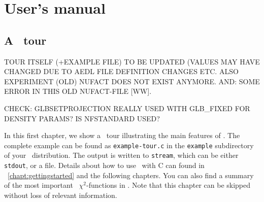 
\part{User's manual}
\label{part:1}

\chapter{A \GLOBES\ tour}
\label{chapter:tour}

TOUR ITSELF (+EXAMPLE FILE) TO BE UPDATED (VALUES MAY HAVE CHANGED DUE TO AEDL FILE DEFINITION
CHANGES ETC. ALSO EXPERIMENT (OLD) NUFACT DOES NOT EXIST ANYMORE. AND: SOME ERROR IN THIS OLD
NUFACT-FILE [WW].

CHECK: GLBSETPROJECTION REALLY USED WITH GLB\_FIXED FOR DENSITY PARAMS? IS NFSTANDARD USED?

In this first chapter, we show a \GLOBES\ tour illustrating the
main features of \GLOBES . The complete example  
can be found as {\tt example-tour.c} in the \verb+example+ subdirectory 
of your \GLOBES\ distribution.
The output is written to {\tt stream}, which can be either {\tt stdout},
or a file. Details about how to use \GLOBES\ with C can found in \Chapt~\ref{chapt:gettingstarted} and the following chapters.
You can also find a summary of the most important \GLOBES\ $\chi^2$-functions in . Note that this chapter
can be skipped without loss of relevant information.

